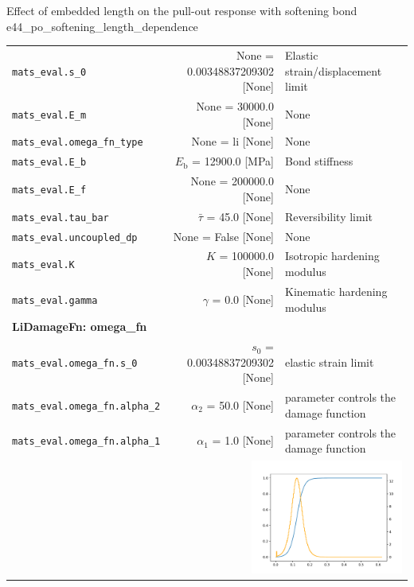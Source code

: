 \documentclass[main.tex]{subfiles}
\begin{document}
\begin{bmcsex}{Effect of embedded length on the pull-out response with softening bond
    }{e44_po_softening_length_dependence}
\begin{center}
{\begin{longtable}{lrp{4cm}}
\texttt{mats\_eval.s\_0} & None = 0.00348837209302 [None] & {\footnotesize Elastic strain/displacement limit}  \\
            \texttt{mats\_eval.E\_m} & None = 30000.0 [None] & {\footnotesize None}  \\
            \texttt{mats\_eval.omega\_fn\_type} & None = li [None] & {\footnotesize None}  \\
            \texttt{mats\_eval.E\_b} & $E_\mathrm{b}$ = 12900.0 [MPa] & {\footnotesize Bond stiffness}  \\
            \texttt{mats\_eval.E\_f} & None = 200000.0 [None] & {\footnotesize None}  \\
            \texttt{mats\_eval.tau\_bar} & $\bar{\tau}$ = 45.0 [None] & {\footnotesize Reversibility limit}  \\
            \texttt{mats\_eval.uncoupled\_dp} & None = False [None] & {\footnotesize None}  \\
            \texttt{mats\_eval.K} & $K$ = 100000.0 [None] & {\footnotesize Isotropic hardening modulus}  \\
            \texttt{mats\_eval.gamma} & $\gamma$ = 0.0 [None] & {\footnotesize Kinematic hardening modulus}  \\
            \midrule
\multicolumn{3}{l}{\textbf{\textsf{LiDamageFn: omega\_fn}}}\\

\texttt{mats\_eval.omega\_fn.s\_0} & $s_0$ = 0.00348837209302 [None] & {\footnotesize elastic strain limit}  \\
            \texttt{mats\_eval.omega\_fn.alpha\_2} & $\alpha_2$ = 50.0 [None] & {\footnotesize parameter controls the damage function}  \\
            \texttt{mats\_eval.omega\_fn.alpha\_1} & $\alpha_1$ = 1.0 [None] & {\footnotesize parameter controls the damage function}  \\
            
\multicolumn{3}{r}{\includegraphics[width=5cm]{examples/e44_po_softening_length_dependence/fig_Li_damage_function.pdf}}\\
\bottomrule 
\end{longtable}
}


\end{center}
\end{bmcsex}
\end{document}
